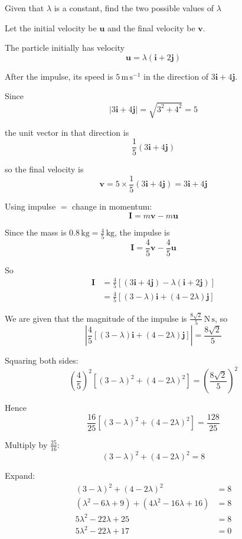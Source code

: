 \documentclass[leqno]{article}
\begin{document}
\begin{enumerate}[
  label=\textbf{\arabic*.},
  leftmargin=*,
  topsep=0pt,
  partopsep=0pt,
  parsep=0pt
]
Given that $\lambda$ is a constant, find the two possible values of $\lambda$ 

\vspace*{10pt}

\begin{djsSolution}
Let the initial velocity be $\mathbf{u}$ and the final velocity be $\mathbf{v}$.

The particle initially has velocity
\[
\mathbf{u}=\lambda(\mathbf{i}+2\mathbf{j})
\]

After the impulse, its speed is $5\,\mathrm{m\,s^{-1}}$ in the direction of $3\mathbf{i}+4\mathbf{j}$.

Since
\[
|3\mathbf{i}+4\mathbf{j}|=\sqrt{3^2+4^2}=5
\]

the unit vector in that direction is
\[
\frac{1}{5}(3\mathbf{i}+4\mathbf{j})
\]

so the final velocity is
\[
\mathbf{v}=5\times\frac{1}{5}(3\mathbf{i}+4\mathbf{j})=3\mathbf{i}+4\mathbf{j}
\]

Using impulse \(=\) change in momentum:
\[
\mathbf{I}=m\mathbf{v}-m\mathbf{u}
\]

Since the mass is $0.8\,\mathrm{kg}=\frac45\,\mathrm{kg}$, the impulse is
\[
\mathbf{I}=\frac45\mathbf{v}-\frac45\mathbf{u}
\]

So
\begin{align*}
\mathbf{I}
&=\frac45\left[(3\mathbf{i}+4\mathbf{j})-\lambda(\mathbf{i}+2\mathbf{j})\right] \\
&=\frac45\left[(3-\lambda)\mathbf{i}+(4-2\lambda)\mathbf{j}\right]
\end{align*}

We are given that the magnitude of the impulse is $\frac{8\sqrt2}{5}\,\mathrm{N\,s}$, so
\[
\left|\frac45\left[(3-\lambda)\mathbf{i}+(4-2\lambda)\mathbf{j}\right]\right|=\frac{8\sqrt2}{5}
\]

Squaring both sides:
\[
\left(\frac45\right)^2\left[(3-\lambda)^2+(4-2\lambda)^2\right]
=\left(\frac{8\sqrt2}{5}\right)^2
\]

Hence
\[
\frac{16}{25}\left[(3-\lambda)^2+(4-2\lambda)^2\right]
=\frac{128}{25}
\]

Multiply by $\frac{25}{16}$:
\[
(3-\lambda)^2+(4-2\lambda)^2=8
\]

Expand:
\begin{align*}
(3-\lambda)^2+(4-2\lambda)^2 &= 8 \\
(\lambda^2-6\lambda+9)+(4\lambda^2-16\lambda+16) &= 8 \\
5\lambda^2-22\lambda+25 &= 8 \\
5\lambda^2-22\lambda+17 &= 0
\end{align*}


\end{djsSolution}
\end{enumerate}
\end{document}
